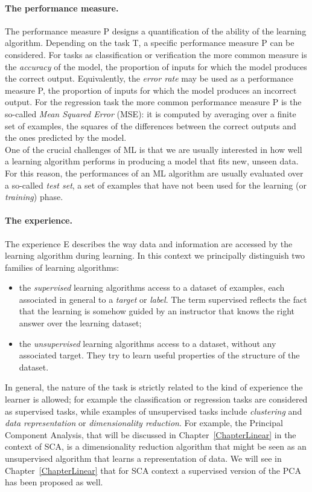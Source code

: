 \paragraph*{The performance measure.} The performance measure P designs a quantification of the ability of the learning algorithm. Depending on the task T, a specific performance measure P can be considered. For tasks as classification or verification the more common measure is the \emph{accuracy} of the model, \ie the proportion of inputs for which the model produces the correct output. Equivalently, the \emph{error rate} may be used as a performance measure P, \ie the proportion of inputs for which the model produces an incorrect output. For the regression task the more common performance measure P is the so-called \emph{Mean Squared Error} (MSE): it is computed by averaging over a finite set of examples, the squares of the differences between the correct outputs and the ones predicted by the model.\\
One of the crucial challenges of ML is that we are usually interested in how well a learning algorithm performs in producing a model that fits new, unseen data. For this reason, the performances of an ML algorithm are usually evaluated over a so-called \emph{test set}, \ie a set of examples that have not been used for the learning (or \emph{training}) phase. 

\paragraph*{The experience.} The experience E describes the way data and information are accessed by the learning algorithm during learning. In this context we principally distinguish two families of learning algorithms: 
\begin{itemize}
\item the \emph{supervised} learning algorithms access to a dataset of examples, each associated in general to a \emph{target} or \emph{label}. The term supervised reflects the fact that the learning is somehow guided by an instructor that knows the right answer over the learning dataset;
\item the \emph{unsupervised} learning algorithms access to a dataset, without any associated target. They try to learn useful properties of the structure of the dataset. 
\end{itemize}
In general, the nature of the task is strictly related to the kind of experience the learner is allowed; for example the classification or regression tasks are considered as supervised tasks, while examples of unsupervised tasks include \emph{clustering} and \emph{data representation} or \emph{dimensionality reduction}. For example, the Principal Component Analysis, that will be discussed in Chapter~\ref{ChapterLinear} in the context of SCA, is a dimensionality reduction algorithm that might be seen as an unsupervised algorithm that learns a representation of data. We will see in Chapter~\ref{ChapterLinear} that for SCA context a supervised version of the PCA has been proposed as well. 


